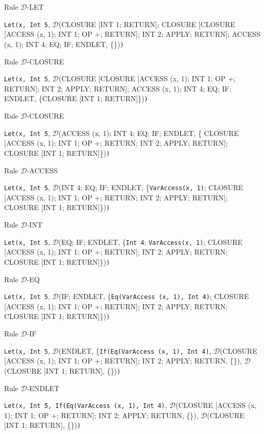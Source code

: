 \documentclass[11pt]{article}
\begin{document}
\begin{landscape}
{\smallskip
\noindent Rule $\mathcal{D}$-LET
\smallskip

\noindent \texttt{Let(x, }\texttt{Int 5}, $\mathcal{D}$(CLOSURE [INT 1; RETURN]; CLOSURE [CLOSURE [ACCESS (x, 1); INT 1; OP +; RETURN]; INT 2; APPLY; RETURN]; ACCESS (x, 1); INT 4; EQ; IF; ENDLET, \{\})\texttt{)}

\smallskip
\noindent Rule $\mathcal{D}$-CLOSURE
\smallskip

\noindent \texttt{Let(x, }\texttt{Int 5}, $\mathcal{D}$(CLOSURE [CLOSURE [ACCESS (x, 1); INT 1; OP +; RETURN]; INT 2; APPLY; RETURN]; ACCESS (x, 1); INT 4; EQ; IF; ENDLET, \{CLOSURE [INT 1; RETURN]\})\texttt{)}

\smallskip
\noindent Rule $\mathcal{D}$-CLOSURE
\smallskip

\noindent \texttt{Let(x, }\texttt{Int 5}, $\mathcal{D}$(ACCESS (x, 1); INT 4; EQ; IF; ENDLET, \{ CLOSURE [ACCESS (x, 1); INT 1; OP +; RETURN; INT 2; APPLY; RETURN]; CLOSURE [INT 1; RETURN]\})\texttt{)}

\smallskip
\noindent Rule $\mathcal{D}$-ACCESS
\smallskip

\noindent \texttt{Let(x, }\texttt{Int 5}, $\mathcal{D}$(INT 4; EQ; IF; ENDLET, \{\texttt{VarAccess(x, 1)}; CLOSURE [ACCESS (x, 1); INT 1; OP +; RETURN; INT 2; APPLY; RETURN]; CLOSURE [INT 1; RETURN]\})\texttt{)}

\smallskip
\noindent Rule $\mathcal{D}$-INT
\smallskip

\noindent \texttt{Let(x, }\texttt{Int 5}, $\mathcal{D}$(EQ; IF; ENDLET, \{\texttt{Int 4}; \texttt{VarAccess(x, 1)}; CLOSURE [ACCESS (x, 1); INT 1; OP +; RETURN]; INT 2; APPLY; RETURN; CLOSURE [INT 1; RETURN]\})\texttt{)}

\smallskip
\noindent Rule $\mathcal{D}$-EQ
\smallskip

\noindent \texttt{Let(x, }\texttt{Int 5}, $\mathcal{D}$(IF; ENDLET, \{\texttt{Eq(VarAccess (x, 1), Int 4)};  CLOSURE [ACCESS (x, 1); INT 1; OP +; RETURN]; INT 2; APPLY; RETURN; CLOSURE [INT 1; RETURN]\})\texttt{)}

\smallskip
\noindent Rule $\mathcal{D}$-IF
\smallskip

\noindent \texttt{Let(x, }\texttt{Int 5}, $\mathcal{D}$(ENDLET, \{\texttt{If(Eq(VarAccess (x, 1), Int 4)}, $\mathcal{D}$(CLOSURE [ACCESS (x, 1); INT 1; OP +; RETURN]; INT 2; APPLY; RETURN, \{\}), $\mathcal{D}$(CLOSURE [INT 1; RETURN], \{\})\texttt{)}


\smallskip
\noindent Rule $\mathcal{D}$-ENDLET
\smallskip

\noindent \texttt{Let(x, Int 5, If(Eq(VarAccess (x, 1), Int 4)}, $\mathcal{D}$(CLOSURE [ACCESS (x, 1); INT 1; OP +; RETURN]; INT 2; APPLY; RETURN, \{\}), $\mathcal{D}$(CLOSURE [INT 1; RETURN], \{\})\texttt{)}

}
\end{landscape}
\end{document}
